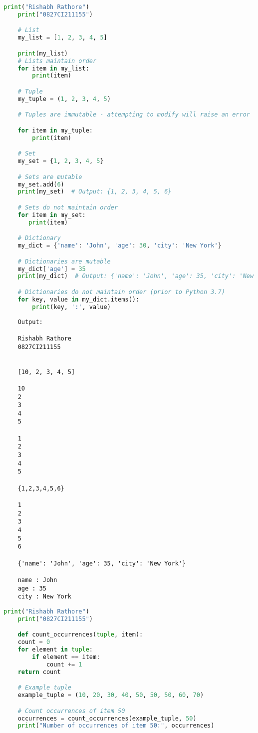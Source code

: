 \documentclass{report}
\begin{document}
\sol 
\begin{lstlisting}[language=Python]
	print("Rishabh Rathore")
	print("0827CI211155")

	# List
	my_list = [1, 2, 3, 4, 5]

	print(my_list)
	# Lists maintain order
	for item in my_list:
    	print(item)

	# Tuple
	my_tuple = (1, 2, 3, 4, 5)

	# Tuples are immutable - attempting to modify will raise an error

	for item in my_tuple:
    	print(item)

	# Set
	my_set = {1, 2, 3, 4, 5}

	# Sets are mutable
	my_set.add(6)
	print(my_set)  # Output: {1, 2, 3, 4, 5, 6}

	# Sets do not maintain order
	for item in my_set:
 	   print(item)

	# Dictionary
	my_dict = {'name': 'John', 'age': 30, 'city': 'New York'}

	# Dictionaries are mutable
	my_dict['age'] = 35
	print(my_dict)  # Output: {'name': 'John', 'age': 35, 'city': 'New York'}

	# Dictionaries do not maintain order (prior to Python 3.7)
	for key, value in my_dict.items():
    	print(key, ':', value)


\end{lstlisting}

\begin{verbatim}
	Output:

	Rishabh Rathore
	0827CI211155


	[10, 2, 3, 4, 5]

	10
	2
	3
	4
	5

	1
	2
	3
	4
	5

	{1,2,3,4,5,6}

	1
	2
	3
	4
	5
	6

	{'name': 'John', 'age': 35, 'city': 'New York'}

	name : John
	age : 35
	city : New York

\end{verbatim}



\bigskip

\sol 
\begin{lstlisting}[language=Python]
	print("Rishabh Rathore")
	print("0827CI211155")

	def count_occurrences(tuple, item):
    count = 0
    for element in tuple:
        if element == item:
            count += 1
    return count

	# Example tuple
	example_tuple = (10, 20, 30, 40, 50, 50, 50, 60, 70)

	# Count occurrences of item 50
	occurrences = count_occurrences(example_tuple, 50)
	print("Number of occurrences of item 50:", occurrences)


\end{lstlisting}
\end{document}
